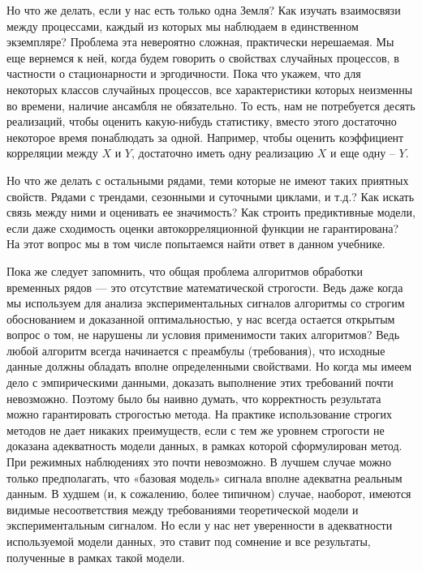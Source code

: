 Но что же делать, если у нас есть только одна Земля? Как изучать
взаимосвязи между процессами, каждый из которых мы наблюдаем в
единственном экземпляре? Проблема эта невероятно сложная,
практически нерешаемая. Мы еще вернемся к ней, когда будем говорить
о свойствах случайных процессов, в частности о стационарности и эргодичности.
Пока что укажем, что для некоторых классов случайных
процессов, все характеристики которых неизменны во времени, наличие
ансамбля не обязательно. То есть, нам не потребуется десять
реализаций, чтобы оценить какую-нибудь статистику, вместо этого
достаточно некоторое время понаблюдать за одной. Например, чтобы
оценить коэффициент корреляции между $X$ и $Y$, достаточно иметь одну
реализацию $X$ и еще одну – $Y$.

Но что же делать с остальными рядами, теми которые не имеют таких
приятных свойств. Рядами с трендами, сезонными и суточными
циклами, и т.д.? Как искать связь между ними и оценивать ее
значимость? Как строить предиктивные модели, если даже сходимость
оценки автокорреляционной функции не гарантирована? На этот вопрос мы в том
числе попытаемся найти ответ в данном учебнике.

Пока же следует запомнить, что общая проблема алгоритмов обработки
временных рядов — это отсутствие математической строгости. Ведь даже когда
мы используем для анализа экспериментальных сигналов алгоритмы со
строгим обоснованием и доказанной оптимальностью, у нас всегда
остается открытым вопрос о том, не нарушены ли условия применимости
таких алгоритмов? Ведь любой алгоритм всегда начинается с преамбулы
(требования), что исходные данные должны обладать вполне
определенными свойствами. Но когда мы имеем дело с
эмпирическими данными, доказать выполнение этих требований
почти невозможно. Поэтому было бы наивно думать, что корректность
результата можно гарантировать строгостью метода. На практике
использование строгих методов не дает никаких преимуществ, если с
тем же уровнем строгости не доказана адекватность модели данных, в
рамках которой сформулирован метод. При режимных наблюдениях это
почти невозможно. В лучшем случае можно только предполагать, что
«базовая модель» сигнала вполне адекватна реальным данным. В худшем
(и, к сожалению, более типичном) случае, наоборот, имеются видимые
несоответствия между требованиями теоретической модели и
экспериментальным сигналом. Но если у нас нет уверенности в
адекватности используемой модели данных, это ставит под сомнение и
все результаты, полученные в рамках такой модели.

